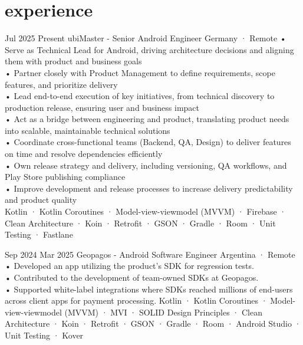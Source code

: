 \documentclass[a4paper,nocolors]{friggeri-cv}
\begin{document}

\section{experience}

\begin{entrylist}



\entryexperience
{Jul 2025}
{Present}
{ubiMaster - Senior Android Engineer}
{Germany · Remote}
{
• Serve as Technical Lead for Android, driving architecture decisions and aligning them with product and business goals\\
• Partner closely with Product Management to define requirements, scope features, and prioritize delivery\\
• Lead end-to-end execution of key initiatives, from technical discovery to production release, ensuring user and business impact\\
• Act as a bridge between engineering and product, translating product needs into scalable, maintainable technical solutions\\
• Coordinate cross-functional teams (Backend, QA, Design) to deliver features on time and resolve dependencies efficiently\\
• Own release strategy and delivery, including versioning, QA workflows, and Play Store publishing compliance\\
• Improve development and release processes to increase delivery predictability and product quality\\
}
{
  Kotlin · Kotlin Coroutines · Model-view-viewmodel (MVVM) · Firebase · Clean Architecture · Koin · Retrofit · GSON · Gradle · Room · Unit Testing · Fastlane
}


\entryexperience
{Sep 2024}
{Mar 2025}
{Geopagos - Android Software Engineer}
{Argentina · Remote}
{
• Developed an app utilizing the product's SDK for regression tests.\\
• Contributed to the development of team-owned SDKs at Geopagos.\\
• Supported white-label integrations where SDKs reached millions of end-users across client apps for payment processing.
}
{
  Kotlin · Kotlin Coroutines · Model-view-viewmodel (MVVM) · MVI · SOLID Design Principles · Clean Architecture · Koin · Retrofit · GSON · Gradle · Room · Android Studio · Unit Testing · Kover 
}


\end{entrylist}
\end{document}
